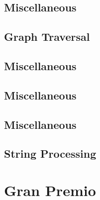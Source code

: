 \subsection{Miscellaneous}
\raggedbottom
\vspace{-.7\baselineskip}\hrulefill
\vspace{0.1\baselineskip}\subsection{Graph Traversal}
\raggedbottom
\vspace{-.7\baselineskip}\hrulefill
\vspace{0.1\baselineskip}\subsection{Miscellaneous}
\raggedbottom
\vspace{-.7\baselineskip}\hrulefill
\vspace{0.1\baselineskip}\subsection{Miscellaneous}
\raggedbottom
\vspace{-.7\baselineskip}\hrulefill
\vspace{0.1\baselineskip}\subsection{Miscellaneous}
\raggedbottom
\vspace{-.7\baselineskip}\hrulefill
\vspace{0.1\baselineskip}\subsection{String Processing}
\raggedbottom
\vspace{-.7\baselineskip}\hrulefill
\vspace{0.1\baselineskip}
\section{Gran Premio}
